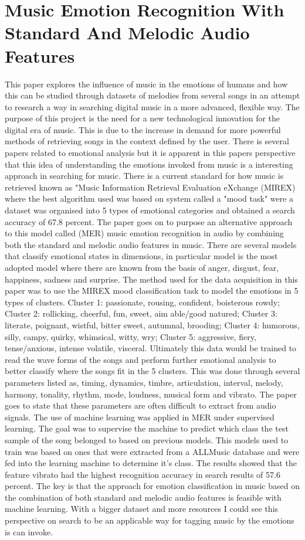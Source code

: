 \documentclass[12pt]{article} %
\begin{document}
\section{Music Emotion Recognition With Standard And Melodic Audio Features} %
This paper explores the influence of music in the emotions of humans and how this can be studied through datasets of melodies from several songs in an attempt to research a way in searching digital music in a more advanced, flexible way. The purpose of this project is the need for a new technological innovation for the digital era of music. This is due to the increase in demand for more powerful methods of retrieving songs in the context defined by the user. There is several papers related to emotional analysis but it is apparent in this papers perspective that this idea of understanding the emotions invoked from music is a interesting approach in searching for music. There is a current standard for how music is retrieved known as "Music Information Retrieval Evaluation eXchange (MIREX) where the best algorithm used was based on system called a "mood task" were a dataset was organised into 5 types of emotional categories and obtained a search accuracy of 67.8 percent. The paper goes on to purpose an alternative approach to this model called (MER) music emotion recognition in audio by combining both the standard and melodic audio features in music. There are several models that classify emotional states in dimensions, in particular \cite{Russell} model is the most adopted model where there are known from the basis of anger, disgust, fear, happiness, sadness and surprise. The method used for the data acquisition in this paper was to use the MIREX mood classification task to model the emotions in 5 types of clusters. Cluster 1: passionate, rousing, confident, boisterous rowdy; Cluster 2: rollicking, cheerful, fun, sweet, aim able/good natured; Cluster 3: literate, poignant, wistful, bitter sweet, autumnal, brooding; Cluster 4: humorous, silly, campy, quirky, whimsical, witty, wry; Cluster 5: aggressive, fiery, tense/anxious, intense volatile, visceral. Ultimately this data would be trained to read the wave forms of the songs and perform further emotional analysis to better classify where the songs fit in the 5 clusters. This was done through several parameters listed as, timing, dynamics, timbre, articulation, interval, melody, harmony, tonality, rhythm, mode, loudness, musical form and vibrato. The paper goes to state that these parameters are often difficult to extract from audio signals. The use of machine learning was applied in MER under supervised learning. The goal was to supervise the machine to predict which class the test sample of the song belonged to based on previous models. This models used to train was based on ones that were extracted from a ALLMusic database and were fed into the learning machine to determine it's class. The results showed that the feature vibrato had the highest recognition accuracy in search results of 57.6 percent. The key is that the approach for emotion classification in music based on the combination of both standard and melodic audio features is feasible with machine learning. With a bigger dataset and more resources I could see this perspective on search to be an applicable way for tagging music by the emotions is can invoke.
\end{document}
